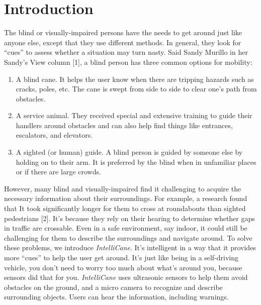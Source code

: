 \section{Introduction}
The blind or visually-impaired persons have the needs to get around just like anyone else, except that they use different methods. In general, they look for “cues” to assess whether a situation may turn nasty. Said Sandy Murillo in her Sandy’s View column [1], a blind person has three common options for mobility:

\begin{enumerate}
  \item A blind cane. It helps the user know when there are tripping hazards such as cracks, poles, etc. The cane is swept from side to side to clear one’s path from obstacles.
  \item A service animal. They received special and extensive training to guide their handlers around obstacles and can also help find things like entrances, escalators, and elevators.
  \item A sighted (or human) guide. A blind person is guided by someone else by holding on to their arm. It is preferred by the blind when in unfamiliar places or if there are large crowds.
\end{enumerate}
However, many blind and visually-impaired find it challenging to acquire the necessary information about their surroundings. For example, a research found that It took significantly longer for them to cross at roundabouts than sighted pedestrians [2]. It’s because they rely on their hearing to determine whether gaps in traffic are crossable.
\newline\newline
Even in a safe environment, say indoor, it could still be challenging for them to describe the surroundings and navigate around.
\newline\newline
To solve these problems, we introduce \textit{IntelliCane}. It’s intelligent in a way that it provides more “cues” to help the user get around. It’s just like being in a self-driving vehicle, you don’t need to worry too much about what’s around you, because sensors did that for you.
\newline\newline
\textit{IntelliCane} uses ultrasonic sensors to help them avoid obstacles on the ground, and a micro camera to recognize and describe surrounding objects. Users can hear the information, including warnings.


